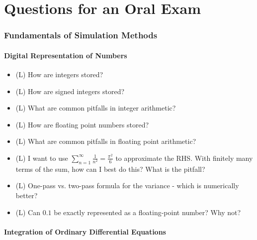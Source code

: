 \part{Questions for an Oral Exam}
\thispagestyle{plain}

\section{Fundamentals of Simulation Methods}

\subsection*{Digital Representation of Numbers}

\begin{itemize}
    \item (L) How are integers stored?
    \item (L) How are signed integers stored?
    \item (L) What are common pitfalls in integer arithmetic?
    \item (L) How are floating point numbers stored?
    \item (L) What are common pitfalls in floating point arithmetic?
    \item (L) I want to use $\sum_{n=1}^{\infty} \frac{1}{n^2} = \frac{\pi^2}{6}$ to approximate
    the RHS. With finitely many terms of the sum, how can I best do this? What is the pitfall?
    \item (L) One-pass vs. two-pass formula for the variance - which is numerically better?
    \item (L) Can $0.1$ be exactly represented as a floating-point number? Why not?
\end{itemize}

\subsection*{Integration of Ordinary Differential Equations}


